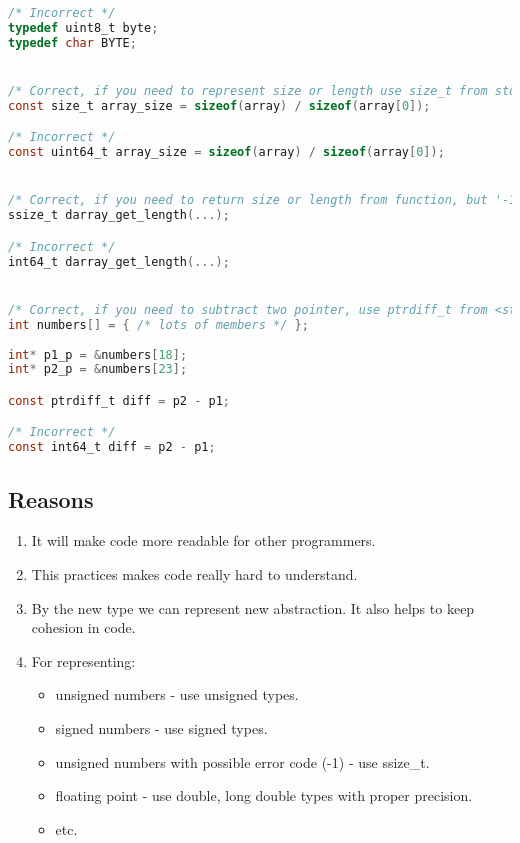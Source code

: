 \begin{enumerate}
\begin{lstlisting}[language=C,style=C99]
/* Incorrect */
typedef uint8_t byte;
typedef char BYTE;


/* Correct, if you need to represent size or length use size_t from stddef.h */
const size_t array_size = sizeof(array) / sizeof(array[0]);

/* Incorrect */
const uint64_t array_size = sizeof(array) / sizeof(array[0]);


/* Correct, if you need to return size or length from function, but '-1' is error message use ssize_t from sys/types.h */
ssize_t darray_get_length(...);

/* Incorrect */
int64_t darray_get_length(...);


/* Correct, if you need to subtract two pointer, use ptrdiff_t from <stddef.h> */
int numbers[] = { /* lots of members */ };
 
int* p1_p = &numbers[18]; 
int* p2_p = &numbers[23];

const ptrdiff_t diff = p2 - p1;

/* Incorrect */
const int64_t diff = p2 - p1;
\end{lstlisting}
\end{enumerate}

\subsection{Reasons}
\begin{enumerate}
    \item It will make code more readable for other programmers.
    \item This practices makes code really hard to understand.
    \item By the new type we can represent new abstraction. It also helps to keep cohesion in code.
    \item For representing:
        \begin{itemize} 
            \item unsigned numbers - use unsigned types.
            \item signed numbers - use signed types.
            \item unsigned numbers with possible error code (-1) - use ssize\_t.
            \item floating point - use double, long double types with proper precision.
            \item etc.
        \end{itemize}
\end{enumerate}